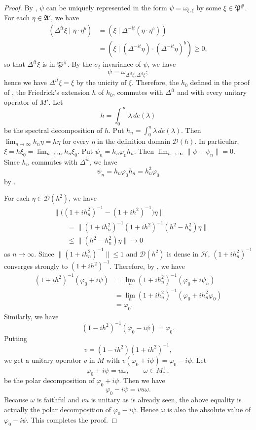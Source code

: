\documentclass[12pt,b5paper,twoside]{article}
\theoremstyle{takesaki}
\numberwithin{equation}{section}
\begin{document}
\begin{proof}
By , $\psi$ can be uniquely represented in the form
$\psi=\omega_{\xi,\xi}$ by some $\xi\in\mathfrak P^{\#}$.  For each
$\eta\in\mathfrak A'$, we have
\begin{align*}
  (\Delta^{it}\xi\mid\eta\cdot\eta^b)
    &=(\xi\mid\Delta^{-it}(\eta\cdot\eta^b))\\
    &=(\xi\mid(\Delta^{-it}\eta)\cdot(\Delta^{-it}\eta)^b)\geq0,
\end{align*}
so that $\Delta^{it}\xi$ is in $\mathfrak P^{\#}$.  By the
$\sigma_t$-invariance of $\psi$, we have
\[
  \psi=\omega_{\Delta^{it}\xi,\Delta^{it}\xi};
\]
hence we have $\Delta^{it}\xi=\xi$ by the unicity of $\xi$.
Therefore, the $h_0$ defined in the proof of , the
Friedrick's extension $h$ of $h_0$, commutes with $\Delta^{it}$ and with
every unitary operator of $M'$.  Let
\[
  h=\int_0^\infty\lambda\,de(\lambda)
\]
be the spectral decomposition of $h$.  Put
$h_n=\int_0^n\lambda\,de(\lambda)$.  Then
$\lim_{n\to\infty}h_n\eta=h\eta$ for every $\eta$ in the definition
domain $\mathcal D(h)$.  In particular,
$\xi=h\xi_0=\lim_{n\to\infty}h_n\xi_0$.  Put
$\psi_n=h_n\varphi_0h_n$.  Then
$\lim_{n\to\infty}\lVert\psi-\psi_n\rVert=0$.  Since $h_n$ commutes
with $\Delta^{it}$, we have
\[
  \psi_n=h_n\varphi_0h_n=h_n^2\varphi_0
\]
by .

For each $\eta\in\mathcal D(h^2)$, we have
\begin{align*}
 &\bigl\lVert\bigl((1+ih_n^2)^{-1}-(1+ih^2)^{-1}\bigr)\eta\bigr\rVert\\
 &\qquad=\bigl\lVert(1+ih_n^2)^{-1}(1+ih^2)^{-1}
       (h^2-h_n^2)\eta\bigr\rVert\\
 &\qquad\leq\lVert(h^2-h_n^2)\eta\rVert\longrightarrow0
\end{align*}
as $n\to\infty$.  Since $\lVert(1+ih_n^2)^{-1}\rVert\leq1$ and
$\mathcal D(h^2)$ is dense in $\mathcal H$,
$(1+ih_n^2)^{-1}$ converges strongly to $(1+ih^2)^{-1}$.  Therefore, by
, we have
\begin{align*}
  (1+ih^2)^{-1}(\varphi_0+i\psi)
    &=\lim_n(1+ih_n^2)^{-1}(\varphi_0+i\psi_n)\\
    &=\lim_n(1+ih_n^2)^{-1}(\varphi_0+ih_n^2\varphi_0)\\
    &=\varphi_0.
\end{align*}
Similarly, we have
\[
  (1-ih^2)^{-1}(\varphi_0-i\psi)=\varphi_0.
\]
Putting
\[
  v=(1-ih^2)(1+ih^2)^{-1},
\]
we get a unitary operator $v$ in $M$ with
$v(\varphi_0+i\psi)=\varphi_0-i\psi$.  Let
\[
  \varphi_0+i\psi=u\omega,\qquad \omega\in M_*^+,
\]
be the polar decomposition of $\varphi_0+i\psi$.  Then we have
\[
  \varphi_0-i\psi=vu\omega.
\]
Because $\omega$ is faithful and $vu$ is unitary as is already seen, the
above equality is actually the polar decomposition of
$\varphi_0-i\psi$.  Hence $\omega$ is also the absolute value of
$\varphi_0-i\psi$.  This completes the proof.
\end{proof}
\end{document}
